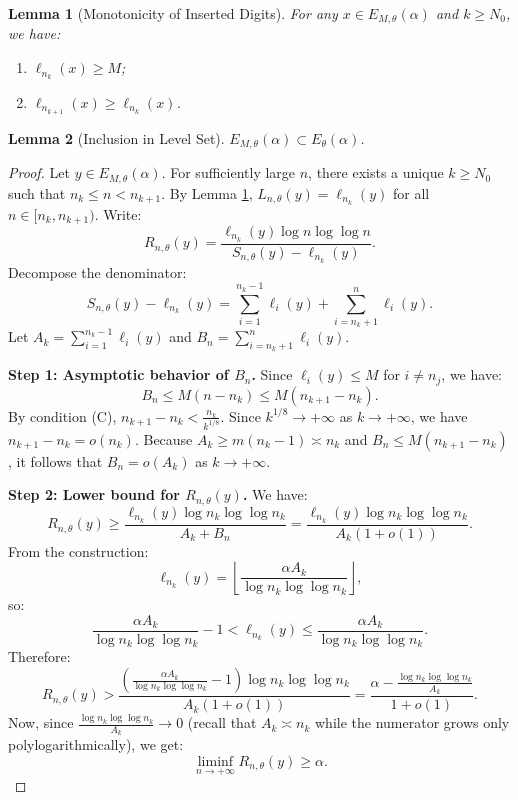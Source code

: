 \documentclass[10pt,a4paper]{amsart}
\newtheorem{lemma}{Lemma}
\begin{document}
\begin{lemma}[Monotonicity of Inserted Digits] \label{lem:monotonicity}
For any $x \in E_{M,\theta}(\alpha)$ and $k \geq N_0$, we have:
\begin{enumerate}
\item[(a)] $\ell_{n_k}(x) \geq M$;
\item[(b)] $\ell_{n_{k+1}}(x) \geq \ell_{n_k}(x)$.
\end{enumerate}
\end{lemma}

\begin{lemma}[Inclusion in Level Set] \label{lem:inclusion}
$E_{M,\theta}(\alpha) \subset E_\theta(\alpha)$.
\end{lemma}

\begin{proof}
Let $y \in E_{M,\theta}(\alpha)$. For sufficiently large $n$, there exists a unique $k \geq N_0$ such that $n_k \leq n < n_{k+1}$.
By Lemma \ref{lem:monotonicity}, $L_{n,\theta}(y) = \ell_{n_k}(y)$ for all $n \in [n_k, n_{k+1})$. Write:
\[
R_{n,\theta}(y) = \frac{\ell_{n_k}(y) \log n \log \log n}{S_{n,\theta}(y) - \ell_{n_k}(y)}.
\]
Decompose the denominator:
\[
S_{n,\theta}(y) - \ell_{n_k}(y) = \sum_{i=1}^{n_k-1} \ell_i(y) + \sum_{i=n_k+1}^n \ell_i(y).
\]
Let $A_k = \displaystyle \sum_{i=1}^{n_k-1} \ell_i(y)$ and $B_n = \displaystyle \sum_{i=n_k+1}^n \ell_i(y)$.

\noindent \textbf{Step 1: Asymptotic behavior of $B_n$.}
Since $\ell_i(y) \leq M$ for $i \neq n_j$, we have:
\[
B_n \leq M(n - n_k) \leq M(n_{k+1} - n_k).
\]
By condition (C), $n_{k+1} - n_k < \frac{n_k}{k^{1/8}}$. 
Since $k^{1/8} \to +\infty$ as $k \to +\infty$, we have $n_{k+1} - n_k = o(n_k)$. 
{Because $A_k \geq m(n_k - 1) \asymp n_k$ and $B_n \leq M(n_{k+1} - n_k)$, it follows that $B_n = o(A_k)$ as $k \to +\infty$.}

\noindent \textbf{Step 2: Lower bound for $R_{n,\theta}(y)$.}
We have:
\[
R_{n,\theta}(y) \geq \frac{\ell_{n_k}(y) \log n_k \log \log n_k}{A_k + B_n}= \frac{\ell_{n_k}(y) \log n_k \log \log n_k}{A_k(1 + o(1))}.
\]
%
From the construction:
\[
\ell_{n_k}(y) = \left\lfloor \frac{\alpha A_k}{\log n_k \log \log n_k} \right\rfloor,
\]
so:
\[
\frac{\alpha A_k}{\log n_k \log \log n_k} - 1 < \ell_{n_k}(y) \leq \frac{\alpha A_k}{\log n_k \log \log n_k}.
\]
Therefore:
\[
R_{n,\theta}(y) > \frac{\left( \frac{\alpha A_k}{\log n_k \log \log n_k} - 1 \right) \log n_k \log \log n_k}{A_k(1 + o(1))} = \frac{\alpha - \frac{\log n_k \log \log n_k}{A_k}}{1 + o(1)}.
\]
Now, since $\frac{\log n_k \log \log n_k}{A_k} \to 0$ {(recall that $A_k \asymp n_k$ while the numerator grows only polylogarithmically)}, we get:
\[
\liminf_{n \to +\infty} R_{n,\theta}(y) \geq \alpha.
\]


\end{proof}
\end{document}
